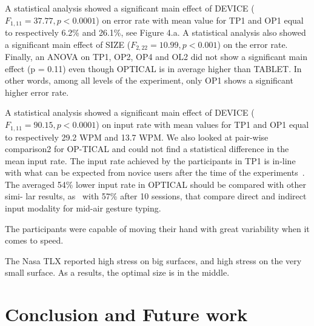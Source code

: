 \documentclass{chi-ext}
\begin{document}
A statistical analysis showed a significant main effect of DEVICE ($F_{1,11} = 37.77, p < 0.0001$) on error rate with mean value for TP1 and OP1 equal to respectively 6.2\% and 26.1\%, see Figure 4.a. A statistical analysis also showed a significant main effect of SIZE ($F_{2,22} = 10.99, p < 0.001$) on the error rate. Finally, an ANOVA on TP1, OP2, OP4 and OL2 did not show a significant main effect (p = 0.11) even though OPTICAL is in average higher than TABLET. In other words, among all levels of the experiment, only OP1 shows a significant higher error rate.

A statistical analysis showed a significant main effect of DEVICE ($F_{1,11} = 90.15, p < 0.0001$) on input rate with mean values for TP1 and OP1 equal to respectively 29.2 WPM and 13.7 WPM. We also looked at pair-wise comparison2 for OP-TICAL and could not find a statistical difference in the mean input rate. The input rate achieved by the participants in TP1 is in-line with what can be expected from novice users after the time of the experiments~\cite{Kristensson2004}. The averaged 54\% lower input rate in OPTICAL should be compared with other simi- lar results, as~\cite{Markussen2014} with 57\% after 10 sessions, that compare direct and indirect input modality for mid-air gesture typing.


The participants were capable of moving their hand with great variability when it comes to speed.

The Nasa TLX reported high stress on big surfaces, and high stress on the very small surface. As a results, the optimal size is in the middle.


\section{Conclusion and Future work}
\end{document}
